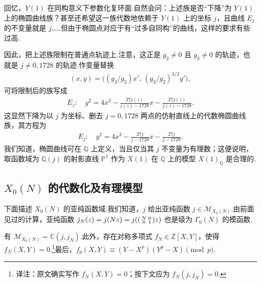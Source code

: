 回忆，$Y(1)$ 在同构意义下参数化复环面.自然会问：上述族是否``下降''为 $Y(1)$ 上的椭圆曲线族？甚至还希望这一族代数地依赖于 $Y(1)$ 上的坐标 $j$，且曲线 $E_j$ 的不变量就是 $j$……但由于椭圆点对应于有``过多自同构''的曲线，这样的要求有些过高.



因此，把上述族限制在普通点轨迹上.注意，这正是 $g_2\ne0$ 且 $g_3\ne0$ 的轨迹，也就是 $j\ne0,1728$ 的轨迹.作变量替换
\begin{align*}
(x,y)=\bigl((g_3/g_2)x',\,(g_3/g_2)^{3/2}y'\bigr),
\end{align*}
可将限制后的族写成
\begin{align*}
E_z:\quad y^2=4x^3-\frac{27j(z)}{j(z)-1728}x-\frac{27j(z)}{j(z)-1728}.
\end{align*}
这显然下降为以 $j$ 为坐标、删去 $j=0,1728$ 两点的仿射直线上的代数椭圆曲线族，其方程为
\begin{align*}
E_j:\quad y^2=4x^3-\frac{27j}{j-1728}x-\frac{27j}{j-1728}.
\end{align*}
我们知道，椭圆曲线可在 $\mathbb Q$ 上定义，当且仅当其 $j$ 不变量为有理数；这便说明，取函数域为 $\mathbb Q(j)$ 的射影直线 $\mathbb P^1$ 作为 $X(1)$ 在 $\mathbb Q$ 上的模型 $X(1)_{\mathbb Q}$ 是合理的.



\subsection{\texorpdfstring{$X_0(N)$}{X₀(N)} 的代数化及有理模型}\label{sec:modular-2-3-3}

下面描述 $X_0(N)$ 的亚纯函数域.我们知道，$j$ 给出亚纯函数 $j\in\mathcal M_{X_0(N)}$.由前面见过的计算，亚纯函数 $j_N(z)=j(Nz)=j(\begin{psmallmatrix}N&0\\0&1\end{psmallmatrix}z)$ 也是级为 $\Gamma_0(N)$ 的模函数.

\begin{theorem*}

有 $\mathcal M_{X_0(N)}=\mathbb C(j,j_N)$.此外，存在对称多项式 $f_N\in\mathbb Z[X,Y]$，使得 $f_N(X,Y)=0$.\footnote{译注：原文确实写作 $f_N(X,Y)=0$；按下文应为 $f_N(j,j_N)=0$.}最后，$f_p(X,Y)\equiv(Y-X^p)(Y^p-X)\pmod p$.

\end{theorem*}

